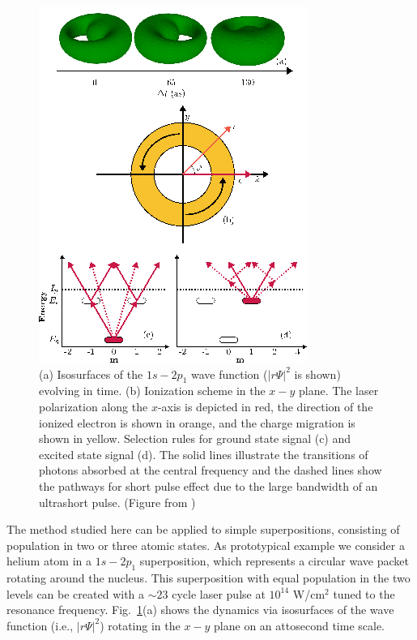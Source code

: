 \begin{figure}[!ht]
\centering
\includegraphics[width=0.7\linewidth]{figs/Photo_ionization/superpositions/Venzke_new_fig_1.png}
\caption{(a) Isosurfaces of the $1s-2p_1$ wave function ($|r\Psi|^2$ is shown) evolving in time. (b) Ionization scheme in the $x-y$ plane. The laser polarization along the $x$-axis is depicted in red, the direction of the ionized electron is shown in orange, and the charge migration is shown in yellow. Selection rules for ground state signal (c) and excited state signal (d). The solid lines illustrate the transitions of photons absorbed at the central frequency and the dashed lines show the pathways for short pulse effect due to the large bandwidth of an ultrashort pulse. (Figure from \cite{venzke2021_wave})
} 
  \label{fig:dynamic_visualization}
\end{figure}

The method studied here can be applied to simple superpositions, consisting of population in two or three atomic states. As prototypical example we consider a helium atom in a $1s-2p_1$ superposition, which represents a circular wave packet rotating around the nucleus. This superposition with equal population in the two levels can be created with a $\sim23$ cycle laser pulse at $10^{14}$ W/cm$^2$ tuned to the resonance frequency. Fig.~\ref{fig:dynamic_visualization}(a) shows the dynamics via isosurfaces of the wave function (i.e., $\left|r\Psi\right|^2$) rotating in the $x-y$ plane on an attosecond time scale. 

